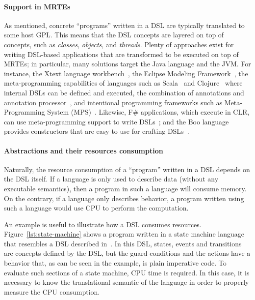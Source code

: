 \paragraph{Support in MRTEs} 
As mentioned, concrete ``programs'' written in a DSL are typically translated to some host GPL.
This means that the DSL concepts are layered on top of concepts, such as \textit{classes}, \textit{objects}, and \textit{threads}.
Plenty of approaches exist for writing DSL-based applications that are transformed to be executed on top of MRTEs; in particular, many solutions target the Java language and the JVM.
For instance, the Xtext language workbench~\cite{Eysholdt:2010:XIY:1869542.1869625}, the Eclipse Modeling Framework~\cite{EMFModeling}, the meta-programming capabilities of languages such as Scala~\cite{Hofer:2010:MDL:1868294.1868307} and Clojure~\cite{Kelker2013} where internal DSLs can be defined and executed, the combination of annotations and annotation processor~\cite{Huang2008}, and intentional programming frameworks such as Meta-Programming System (MPS)~\cite{JetBrainsMetaProgrammingSystem(MPS),Voelter2014}.
Likewise, F\# applications, which execute in CLR, can use meta-programming support to write DSLs~\cite{Cheney:2013:PTL:2500365.2500586}; and the Boo language provides constructors that are easy to use for crafting DSLs~\cite{Rahien2010}. 

\paragraph{Abstractions and their resources consumption} 
Naturally, the resource consumption of a ``program'' written in a DSL depends on the DSL itself.
If a language is only used to describe data (without any executable semantics), then a program in such a language will consume memory.
On the contrary, if a language only describes behavior, a program written using such a language would use CPU to perform the computation.

An example is useful to illustrate how a DSL consumes resources.
Figure~\ref{lst:state-machine} shows a program written in a state machine language that resembles a DSL described in~\cite{Voelter2010}.
In this DSL, states, events and transitions are concepts defined by the DSL, but the guard conditions and the actions have a behavior that, as can be seen in the example, is plain imperative code.
To evaluate such sections of a state machine, CPU time is required.
In this case, it is necessary to know the translational semantic of the language in order to properly measure the CPU consumption.

